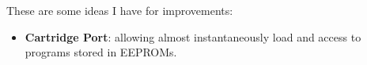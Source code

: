 \documentclass[a4paper,11pt]{article}
\begin{document}
    These are some ideas I have for improvements:

    \begin{itemize}
        \item \textbf{Cartridge Port}: allowing almost instantaneously load and
        access to programs stored in EEPROMs.
    \end{itemize}

    \pagebreak
    
    
\end{document}
